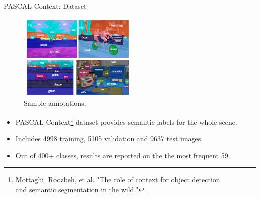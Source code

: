 \documentclass{beamer}
\begin{document}
\begin{frame}{PASCAL-Context: Dataset}	
\vspace{-0.3cm}
\begin{figure}
	\centering
	\includegraphics[width=0.50\textwidth]{figure/ss45.png}
	\captionsetup{justification=centering}
	\caption{Sample annotations.}
\end{figure}
\vspace{-0.5cm}
\begin{itemize}
	\item PASCAL-Context\footnote{Mottaghi, Roozbeh, et al. "The role of context for object detection\\ and semantic segmentation in the wild."} dataset provides semantic labels for the whole scene.
	\item Includes {\color{blue}4998} training, {\color{blue}5105} validation and {\color{blue}9637} test images.
	\item Out of {\color{blue}400+} classes, results are reported on the the most frequent {\color{blue}59}.
\end{itemize}
\end{frame}
\end{document}
